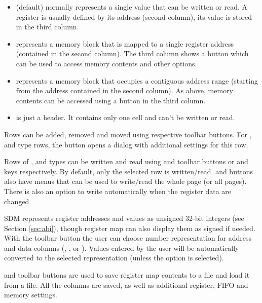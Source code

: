 \documentclass[a4paper,12pt,twoside,extrafontsizes]{memoir}
\begin{document}
\begin{itemize}
	\item {} (default) normally represents a single value that can be written or read. A register is usually defined by its address (second column), its value is stored in the third column.
	\item {} represents a memory block that is mapped to a single register address (contained in the second column). The third column shows a button which can be used to access memory contents and other options.
	\item {} represents a memory block that occupies a contiguous address range (starting from the address contained in the second column). As above, memory contents can be accessed using a button in the third column.
	\item {} is just a header. It contains only one cell and can't be written or read.
\end{itemize}

Rows can be added, removed and moved using respective toolbar buttons. For ,  and  type rows, the  button opens a dialog with additional settings for this row.

Rows of ,  and  types can be written and read using  and  toolbar buttons or  and  keys respectively. By default, only the selected row is written/read.  and  buttons also have menus that can be used to write/read the whole page (or all pages). There is also an option to write automatically when the register data are changed.

SDM represents register addresses and values as unsigned 32-bit integers (see Section \ref{sec:abi}), though register map can also display them as signed if needed. With the  toolbar button the user can choose number representation for address and data columns (, ,  or ). Values entered by the user will be automatically converted to the selected representation (unless the  option is selected).

 and  toolbar buttons are used to save register map contents to a file and load it from a file. All the columns are saved, as well as additional register, FIFO and memory settings.
\end{document}
